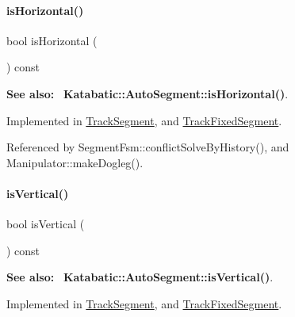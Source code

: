 \mbox{\label{classKite_1_1TrackElement_a9d3db1f8a5aca58f8f54d291faebf873}} 
\paragraph{\texorpdfstring{is\+Horizontal()}{isHorizontal()}}
{\footnotesize\ttfamily bool is\+Horizontal (\begin{DoxyParamCaption}{ }\end{DoxyParamCaption}) const\hspace{0.3cm}{\ttfamily [pure virtual]}}

{\bfseries See also\+:}~ \textbf{ Katabatic\+::\+Auto\+Segment\+::is\+Horizontal()}. 

Implemented in \mbox{\hyperlink{classKite_1_1TrackSegment_a21b9cefd33ae22e4c2070ad441bdd30b}{Track\+Segment}}, and \mbox{\hyperlink{classKite_1_1TrackFixedSegment_a21b9cefd33ae22e4c2070ad441bdd30b}{Track\+Fixed\+Segment}}.



Referenced by Segment\+Fsm\+::conflict\+Solve\+By\+History(), and Manipulator\+::make\+Dogleg().

\mbox{\label{classKite_1_1TrackElement_a6fa2bf0568a2b295dd7cd1f7207247d5}} 
\paragraph{\texorpdfstring{is\+Vertical()}{isVertical()}}
{\footnotesize\ttfamily bool is\+Vertical (\begin{DoxyParamCaption}{ }\end{DoxyParamCaption}) const\hspace{0.3cm}{\ttfamily [pure virtual]}}

{\bfseries See also\+:}~ \textbf{ Katabatic\+::\+Auto\+Segment\+::is\+Vertical()}. 

Implemented in \mbox{\hyperlink{classKite_1_1TrackSegment_abd54544ef1710ee4b67cfb021d73446c}{Track\+Segment}}, and \mbox{\hyperlink{classKite_1_1TrackFixedSegment_abd54544ef1710ee4b67cfb021d73446c}{Track\+Fixed\+Segment}}.

